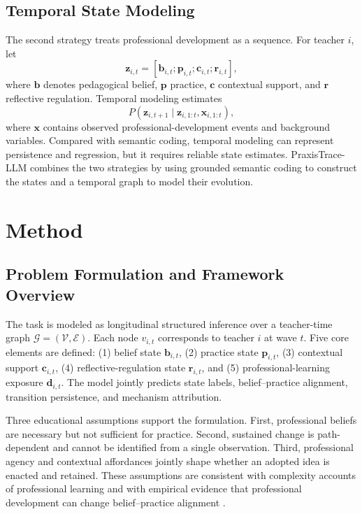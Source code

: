\documentclass[pdflatex,sn-mathphys-num]{sn-jnl}%
\theoremstyle{thmstyleone}%
\theoremstyle{thmstyletwo}%
\theoremstyle{thmstylethree}%
\begin{document}
\subsection{Temporal State Modeling}

The second strategy treats professional development as a sequence. For teacher $i$, let
\[
\mathbf{z}_{i,t}=[\mathbf{b}_{i,t};\mathbf{p}_{i,t};\mathbf{c}_{i,t};\mathbf{r}_{i,t}],
\]
where $\mathbf{b}$ denotes pedagogical belief, $\mathbf{p}$ practice, $\mathbf{c}$ contextual support, and $\mathbf{r}$ reflective regulation. Temporal modeling estimates
\[
P(\mathbf{z}_{i,t+1}\mid \mathbf{z}_{i,1:t},\mathbf{x}_{i,1:t}),
\]
where $\mathbf{x}$ contains observed professional-development events and background variables. Compared with semantic coding, temporal modeling can represent persistence and regression, but it requires reliable state estimates. PraxisTrace-LLM combines the two strategies by using grounded semantic coding to construct the states and a temporal graph to model their evolution.

\section{Method}

\subsection{Problem Formulation and Framework Overview}

The task is modeled as longitudinal structured inference over a teacher-time graph $\mathcal{G}=(\mathcal{V},\mathcal{E})$. Each node $v_{i,t}$ corresponds to teacher $i$ at wave $t$. Five core elements are defined: (1) belief state $\mathbf{b}_{i,t}$, (2) practice state $\mathbf{p}_{i,t}$, (3) contextual support $\mathbf{c}_{i,t}$, (4) reflective-regulation state $\mathbf{r}_{i,t}$, and (5) professional-learning exposure $\mathbf{d}_{i,t}$. The model jointly predicts state labels, belief--practice alignment, transition persistence, and mechanism attribution.

Three educational assumptions support the formulation. First, professional beliefs are necessary but not sufficient for practice. Second, sustained change is path-dependent and cannot be identified from a single observation. Third, professional agency and contextual affordances jointly shape whether an adopted idea is enacted and retained. These assumptions are consistent with complexity accounts of professional learning \cite{opfer2011learning} and with empirical evidence that professional development can change belief--practice alignment \cite{chen2025alignment}.
\end{document}
